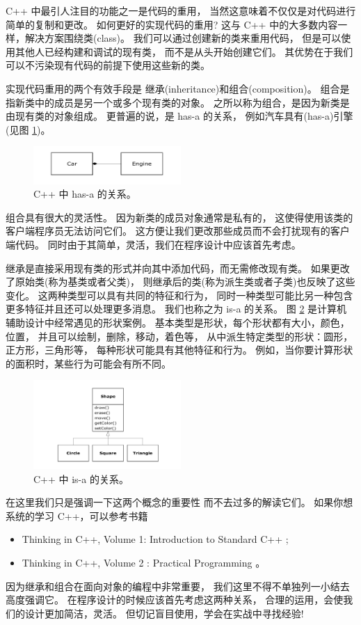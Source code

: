 
C++ 中最引人注目的功能之一是代码的重用，
当然这意味着不仅仅是对代码进行简单的复制和更改。
如何更好的实现代码的重用?
这与 C++ 中的大多数内容一样，解决方案围绕类(class)。 
我们可以通过创建新的类来重用代码，
但是可以使用其他人已经构建和调试的现有类，
而不是从头开始创建它们。
其优势在于我们可以不污染现有代码的前提下使用这些新的类。

实现代码重用的两个有效手段是
继承(inheritance)和组合(composition)。
组合是指新类中的成员是另一个或多个现有类的对象。
之所以称为组合，是因为新类是由现有类的对象组成。
更普遍的说，是 has-a 的关系，
例如汽车具有(has-a)引擎(见图 \ref{fig:has-a})。
\begin{figure}[htbp]
  \centering
  \includegraphics[width=0.5\textwidth]{png/has-a}
  \caption{C++ 中 has-a 的关系。}
  \label{fig:has-a}
\end{figure}
组合具有很大的灵活性。
因为新类的成员对象通常是私有的，
这使得使用该类的客户端程序员无法访问它们。
这方便让我们更改那些成员而不会打扰现有的客户端代码。
同时由于其简单，灵活，我们在程序设计中应该首先考虑。

继承是直接采用现有类的形式并向其中添加代码，而无需修改现有类。
如果更改了原始类(称为基类或者父类)，
则继承后的类(称为派生类或者子类)也反映了这些变化。
这两种类型可以具有共同的特征和行为，
同时一种类型可能比另一种包含更多特征并且还可以处理更多消息。
我们也称之为 is-a 的关系。
图 \ref{fig:is-a} 是计算机辅助设计中经常遇见的形状案例。
基本类型是形状，每个形状都有大小，颜色，位置，
并且可以绘制，删除，移动，着色等，
从中派生特定类型的形状：圆形，正方形，三角形等，
每种形状可能具有其他特征和行为。 
例如，当你要计算形状的面积时，某些行为可能会有所不同。
\begin{figure}[htbp]
	\centering
	\includegraphics[width=0.5\textwidth]{png/is-a}
	\caption{C++ 中 is-a 的关系。}
	\label{fig:is-a}
\end{figure}

在这里我们只是强调一下这两个概念的重要性
而不去过多的解读它们。
如果你想系统的学习 C++，可以参考书籍
\begin{itemize}
	\item Thinking in C++, Volume 1: Introduction to Standard C++
		\cite{eckel2000thinking};
	\item Thinking in C++, Volume 2 : Practical Programming
		\cite{eckel2004thinking}。
\end{itemize}

\begin{remark}
	因为继承和组合在面向对象的编程中非常重要，
	我们这里不得不单独列一小结去高度强调它。
	在程序设计的时候应该首先考虑这两种关系，
	合理的运用，会使我们的设计更加简洁，灵活。
	但切记盲目使用，学会在实战中寻找经验!
\end{remark}






